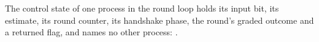 \begin{definition}
  \label{def:aba-core-vocab}
  \leanok
  The control state of one process in the round loop holds its input bit, its estimate, its round counter, its handshake phase, the round's graded outcome and a returned flag, and names no other process: .
\end{definition}
